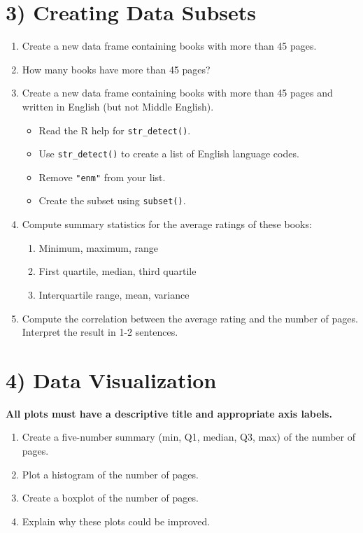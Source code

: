 \documentclass{article}
\begin{document}
\section*{3) Creating Data Subsets}
\begin{enumerate}
    \item Create a new data frame containing books with more than 45 pages.
    \item How many books have more than 45 pages?
    \item Create a new data frame containing books with more than 45 pages and written in English (but not Middle English).
    \begin{itemize}
        \item Read the R help for \texttt{str\_detect()}.
        \item Use \texttt{str\_detect()} to create a list of English language codes.
        \item Remove \texttt{"enm"} from your list.
        \item Create the subset using \texttt{subset()}.
    \end{itemize}
    \item Compute summary statistics for the average ratings of these books:
    \begin{enumerate}
        \item Minimum, maximum, range
        \item First quartile, median, third quartile
        \item Interquartile range, mean, variance
    \end{enumerate}
    \item Compute the correlation between the average rating and the number of pages. Interpret the result in 1-2 sentences.
\end{enumerate}

\section*{4) Data Visualization}
\textbf{All plots must have a descriptive title and appropriate axis labels.}
\begin{enumerate}
    \item Create a five-number summary (min, Q1, median, Q3, max) of the number of pages.
    \item Plot a histogram of the number of pages.
    \item Create a boxplot of the number of pages.
    \item Explain why these plots could be improved.
\end{enumerate}
\end{document}
